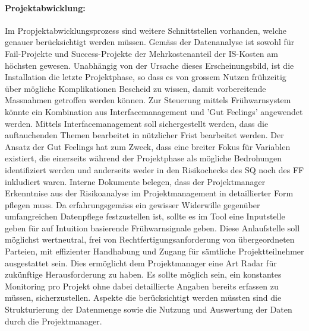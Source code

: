 \paragraph{Projektabwicklung:} Im Propjektabwicklungsprozess sind weitere Schnittstellen vorhanden, welche genauer berücksichtigt werden müssen. Gemäss der Datenanalyse ist sowohl für Fail-Projekte und Success-Projekte der Mehrkostenanteil der IS-Kosten am höchsten gewesen. Unabhängig von der Ursache dieses Erscheinungsbild, ist die Installation die letzte Projektphase, so dass es von grossem Nutzen frühzeitig über mögliche Komplikationen Bescheid zu wissen, damit vorbereitende Massnahmen getroffen werden können. Zur Steuerung mittels Frühwarnsystem könnte ein Kombination aus Interfacemanagement und 'Gut Feelings' angewendet werden. Mittels Interfacemanagement soll sichergestellt werden, dass die auftauchenden Themen bearbeitet in nützlicher Frist bearbeitet werden. Der Ansatz der Gut Feelings hat zum Zweck, dass eine breiter Fokus für Variablen existiert, die einerseits während der Projektphase als mögliche Bedrohungen identifiziert werden und anderseits weder in den Risikochecks des SQ noch des FF inkludiert waren. Interne Dokumente belegen, dass der Projektmanager Erkenntnise aus der Risikoanalyse im Projektmanagement in detaillierter Form pflegen muss. Da erfahrungsgemäss ein gewisser Widerwille gegenüber umfangreichen Datenpflege festzustellen ist, sollte es im Tool eine Inputstelle geben für auf Intuition basierende Frühwarnsignale geben. Diese Anlaufstelle soll möglichst wertneutral, frei von Rechtfertigungsanforderung von übergeordneten Parteien, mit effizienter Handhabung und Zugang für sämtliche Projektteilnehmer ausgestattet sein. Dies ermöglicht dem Projektmanager eine Art Radar für zukünftige Herausforderung zu haben. Es sollte möglich sein, ein konstantes Monitoring pro Projekt ohne dabei detaillierte Angaben bereits erfassen zu müssen, sicherzustellen. Aspekte die berücksichtigt werden müssten sind die Strukturierung der Datenmenge sowie die Nutzung und Auswertung der Daten durch die Projektmanager.
